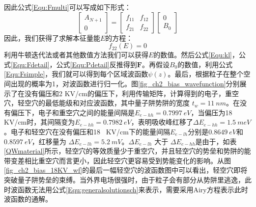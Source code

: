 因此公式\ref{Equ:Fmulti}可以写成如下形式：
\begin{equation}
\label{Equ:Fmulti_simple}
\begin{bmatrix}
A_{N+1}\\
0
\end{bmatrix} = \begin{bmatrix}
f_{11}&f_{12}\\
f_{21}&f_{22}
\end{bmatrix}
\begin{bmatrix}
0\\
B_{0}
\end{bmatrix}
\end{equation}
因此，我们获得了求解本征量能$E$的方程：
\begin{equation}
\label{Equ:sloveE}
f_{22}(E) = 0
\end{equation}
利用牛顿迭代法或者其他数值方法我们可以获得$E$的数值。然后公式\ref{Equ:kl}，公式\ref{Equ:Fdetail}，公式\ref{Equ:Pdetail}反推得到$\textbf{F}$。再假设$B_{0}$的数值，利用公式\ref{Equ:Fsimple}，我们就可以得到每个区域波函数$\psi(z)$。最后，根据粒子在整个空间出现的概率为1，对波函数进行归一化。图\ref{fig_ch2_bias_wavefunction}分别展示了在没有偏压和2 KV/cm的偏压下，利用传输矩阵，计算得到的电子，重空穴，轻空穴的最低能级和对应波函数，其中量子阱势阱的宽度 $t_w =11~nm$。在没有偏压下，电子和重空穴之间的能量间隔是$E_{e-hh} = 0.7997~eV$，当偏压为18 KV/cm时，其间隔变为$E_{e-hh} = 0.7982~eV$，表明吸收峰红移了$\Delta E_{e-hh} = 1.5~meV$。电子和轻空穴在没有偏压和18 ~KV/cm下的能量间隔$E_{e-lh}$分别是$0.8649~eV$和$0.8597~eV$，红移量为 $\Delta E_{e-lh} = 5.2~ mV$。$\Delta E_{e-lh}$ 大于 $\Delta E_{e-hh}$是由于，如表\ref{QWmaterial}所示，轻空穴的等效质量少于重空穴，并且轻空穴的势垒和势阱的能带变差相比重空穴而言更小，因此轻空穴更容易受到势能变化的影响。从图\ref{fig_ch2_bias_18KV_wf}的最后一幅轻空穴的波函数图中可以看出，轻空穴即将突破量子阱势垒的束缚。当外界电场很强时，由于粒子会有部分从势阱里逃逸，此时波函数无法用公式\ref{Equ:generalsolutionsch}来表示，需要采用Airy方程表示此时波函数的通解\cite{chuang1991exciton}。

